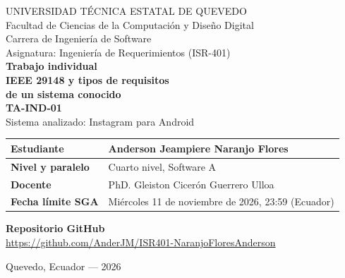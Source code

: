 \documentclass[11pt,a4paper]{article}
\begin{document}
\begin{center}
{\large UNIVERSIDAD TÉCNICA ESTATAL DE QUEVEDO}\\[6pt]
Facultad de Ciencias de la Computación y Diseño Digital\\[3pt]
Carrera de Ingeniería de Software\\[14pt]
Asignatura: Ingeniería de Requerimientos (ISR-401)\\[42pt]
{\LARGE\bfseries Trabajo individual}\\[9pt]
{\Large\bfseries IEEE 29148 y tipos de requisitos\\[4pt]
de un sistema conocido}\\[14pt]
{\large\bfseries TA-IND-01}\\[14pt]
Sistema analizado: Instagram para Android
\end{center}

\vspace{1.4cm}

\begin{tabularx}{\textwidth}{|>{\bfseries}p{4.5cm}|X|}
\hline
Estudiante & Anderson Jeampiere Naranjo Flores \\ \hline
Nivel y paralelo & Cuarto nivel, Software A \\ \hline
Docente & PhD. Gleiston Cicerón Guerrero Ulloa \\ \hline
Fecha límite SGA & Miércoles 11 de noviembre de 2026, 23:59 (Ecuador) \\ \hline
\end{tabularx}

\vspace{1.3cm}

\begin{center}
{\bfseries Repositorio GitHub}\\[12pt]
\small
\mbox{\url{https://github.com/AnderJM/ISR401-NaranjoFloresAnderson}}
\end{center}

\vfill

\begin{center}
Quevedo, Ecuador --- 2026
\end{center}
\end{document}

